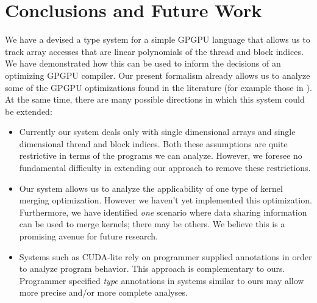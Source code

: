 \documentclass{article}
\renewcommand{\|}{\:|\:}
\begin{document}
\section{Conclusions and Future Work}
We have a devised a type system for a simple GPGPU language that allows us to track array accesses that are linear polynomials of the thread and block indices. We have demonstrated how this can be used to inform the decisions of an optimizing GPGPU compiler. Our present formalism already allows us to analyze some of the GPGPU optimizations found in the literature (for example those in \cite{pldi10}). At the same time, there are many possible directions in which this system could be extended:
\begin{itemize}
\item 
Currently our system deals only with single dimensional arrays and single dimensional thread and block indices. Both these assumptions are quite restrictive in terms of the programs we can analyze. However, we foresee no fundamental difficulty in extending our approach to remove these restrictions.

\item
Our system allows us to analyze the applicability of one type of kernel merging optimization. However we haven't yet implemented this optimization. Furthermore, we have identified \emph{one} scenario where data sharing information can be used to merge kernels; there may be others. We believe this is a promising avenue for future research.

\item
Systems such as CUDA-lite \cite{cuda-lite} rely on programmer supplied annotations in order to analyze program behavior. This approach is complementary to ours. Programmer specified \emph{type} annotations in systems similar to ours may allow more precise and/or more complete analyses.
\end{itemize}
{}

\end{document}
